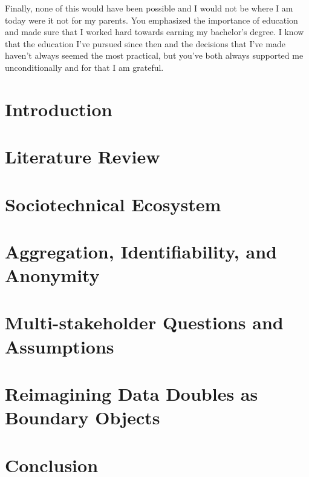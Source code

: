 \documentclass[11pt,openany,oneside]{book}
\begin{document}
Finally, none of this would have been possible and I would not be where I am today were it not for my parents. You emphasized the importance of education and made sure that I worked hard towards earning my bachelor's degree. I know that the education I've pursued since then and the decisions that I've made haven't always seemed the most practical, but you've both always supported me unconditionally and for that I am grateful.

\pagestyle{plain}
\tableofcontents
\listoftables
\listoffigures

\mainmatter

\singlespacing \chapter{Introduction} \label{ch:intro}
\doublespacing 

\singlespacing \chapter{Literature Review} \label{ch:lit}
\doublespacing 

\singlespacing \chapter{Sociotechnical Ecosystem} \label{ch:dbd}
\doublespacing 

\singlespacing \chapter{Aggregation, Identifiability, and Anonymity}  \label{ch:pk}
\doublespacing 

\singlespacing \chapter{Multi-stakeholder Questions and Assumptions} \label{ch:wkshp}
\doublespacing 

\singlespacing \chapter{Reimagining Data Doubles as Boundary Objects} \label{ch:synth}
\doublespacing 

\singlespacing \chapter{Conclusion} \label{ch:conc}
\doublespacing 

\backmatter
\doublespacing 


\end{document}
